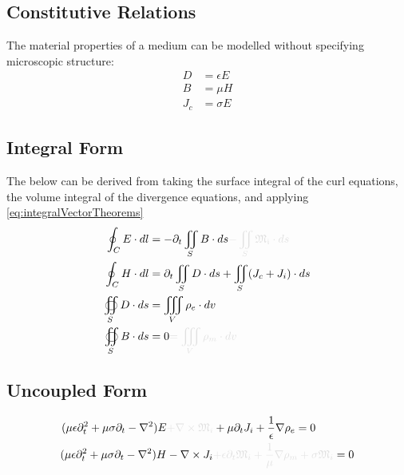 \documentclass{article}
\numberwithin{equation}{section}
\begin{document}
\subsection{Constitutive Relations} 
The material properties of a medium can be modelled without specifying microscopic structure:
    \begin{subequations}\label{eq:Constitutive}
        \begin{align}
            D &= \epsilon E \label{eq:ConstitutiveElectric} \\ 
            B &= \mu H \label{eq:ConstitutiveMagnetic} \\
            J_c &= \sigma E \label{eq:ConstitutiveCurrentDensity}
        \end{align}
    \end{subequations}
\subsection{Integral Form}
The below can be derived from taking the surface integral of the curl equations, the volume integral of the divergence equations, and applying \eqref{eq:integralVectorTheorems}
    \begin{subequations}\label{eq:MaxwellIntegral}
        \begin{align}
            \oint_C E \cdot dl &=  - \partial_t \iint_S B \cdot ds \begingroup \textcolor{vanish}{- \iint_S \mathfrak{M_i} \cdot ds} \endgroup \label{eq:MaxwellFaradayIntegral} \\
            \oint_C H \cdot dl &=  \partial_t \iint_S D \cdot ds + \iint_S ( J_c + J_i ) \cdot ds \label{eq:AmpereMaxwellIntegral} \\
            \oiint_S D \cdot ds &= \iiint_V \rho_e \cdot dv \label{eq:GaussElectricIntegral} \\
            \oiint_S B \cdot ds &= 0 \begingroup \textcolor{vanish}{= \iiint_V \rho_m \cdot dv} \endgroup \label{eq:GaussMagneticIntegral}
        \end{align}
    \end{subequations}
\subsection{Uncoupled Form}
\begin{subequations} \label{eq:fieldEqs}
    \begin{align}
    (\mu \epsilon \partial^2_t + \mu \sigma \partial_t - \nabla^2 ) E & \begingroup \textcolor{vanish}{+ \nabla \times \mathfrak{M}_i} \endgroup + \mu \partial_t J_i + \frac{1}{\epsilon} \nabla \rho_e = 0 \label{eq:electricFieldEq} \\
    (\mu \epsilon \partial^2_t + \mu \sigma \partial_t - \nabla^2 ) H & - \nabla \times J_i \begingroup \textcolor{vanish}{+ \epsilon \partial_t \mathfrak{M}_i + \frac{1}{\mu} \nabla \rho_m + \sigma \mathfrak{M}_i} \endgroup = 0 \label{eq:magneticFieldEq}
    \end{align}
\end{subequations}
\end{document}
